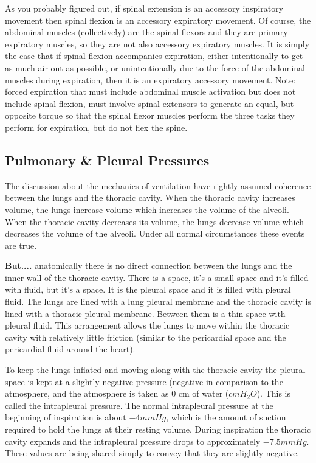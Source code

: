 As you probably figured out, if spinal extension is an accessory inspiratory movement then spinal flexion is an accessory expiratory movement. Of course, the abdominal muscles (collectively) are the spinal flexors and they are primary expiratory muscles, so they are not also accessory expiratory muscles. It is simply the case that if spinal flexion accompanies expiration, either intentionally to get as much air out as possible, or unintentionally due to the force of the abdominal muscles during expiration, then it is an expiratory accessory movement. Note: forced expiration that must include abdominal muscle activation but does not include spinal flexion, must involve spinal extensors to generate an equal, but opposite torque so that the spinal flexor muscles perform the three tasks they perform for expiration, but do not flex the spine.

\subsection{Pulmonary \& Pleural Pressures}
The discussion about the mechanics of ventilation have rightly assumed coherence between the lungs and the thoracic cavity. When the thoracic cavity increases volume, the lungs increase volume which increases the volume of the alveoli. When the thoracic cavity decreases its volume, the lungs decrease volume which decreases the volume of the alveoli. Under all normal circumstances these events are true. 

\textbf{But....} anatomically there is no direct connection between the lungs and the inner wall of the thoracic cavity. There is a space, it's a small space and it's filled with fluid, but it's a space. It is the pleural space and it is filled with pleural fluid. The lungs are lined with a lung pleural membrane and the thoracic cavity is lined with a thoracic pleural membrane. Between them is a thin space with pleural fluid. This arrangement allows the lungs to move within the thoracic cavity with relatively little friction (similar to the pericardial space and the pericardial fluid around the heart). 

To keep the lungs inflated and moving along with the thoracic cavity the pleural space is kept at a slightly negative pressure (negative in comparison to the atmosphere, and the atmosphere is taken as 0 cm of water ($cm H_2O$)\footnotemark{}. This is called the intrapleural pressure. The normal intrapleural pressure at the beginning of inspiration is about $-4 mmHg$, which is the amount of suction required to hold the lungs at their resting volume. During inspiration the thoracic cavity expands and the intrapleural pressure drops to approximately  $-7.5 mmHg$. These values are being shared simply to convey that they are slightly negative. 

